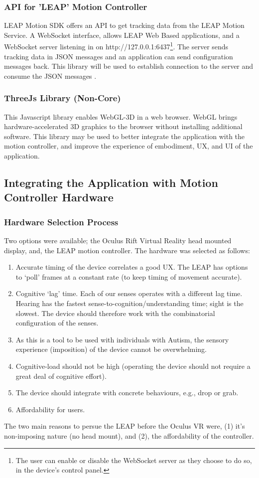 \documentclass[a4paper, 10pt]{article}
\begin{document}
\subsubsection{API for 'LEAP' Motion Controller}
LEAP Motion SDK offers an API to get tracking data from the LEAP Motion Service. A WebSocket interface, allows LEAP Web Based applications, and a WebSocket server listening in on http://127.0.0.1:6437\footnote{The user can enable or disable the WebSocket server as they choose to do so, in the device's control panel.}.
The server sends tracking data in JSON messages and an application can send configuration messages back. This library will be used to establish connection to the server and consume the JSON messages \cite{leap}. 


\subsubsection{ThreeJs Library (Non-Core)}
This Javascript library enables WebGL-3D in a web browser. WebGL brings hardware-accelerated 3D graphics to the browser without installing additional software. This library may be used to better integrate the application with the motion controller, and improve the experience of embodiment, UX, and UI of the application.


\subsection{Integrating the Application with Motion Controller Hardware }\label{hardware}
\subsubsection{Hardware Selection Process}
Two options were available; the Oculus Rift Virtual Reality head mounted display, and, the LEAP motion controller. The hardware was selected as follows: 
\begin{enumerate}
\item Accurate timing of the device correlates a good UX. The LEAP has options to ‘poll’ frames at a constant rate (to keep timing of movement accurate).
\item Cognitive ‘lag’ time. Each of our senses operates with a different lag time. Hearing has the fastest sense-to-cognition/understanding time; sight is the slowest. The device should therefore work with the combinatorial configuration of the senses.
\item As this is a tool to be used with individuals with Autism, the sensory experience (imposition) of the device cannot be overwhelming.
\item Cognitive-load should not be high (operating the device should not require a great deal of cognitive effort).
\item The device should integrate with concrete behaviours, e.g., drop or grab. 
\item Affordability for users.
\end{enumerate}
The two main reasons to persue the LEAP before the Oculus VR were, (1) it's non-imposing nature (no head mount), and (2), the affordability of the controller.
\end{document}

